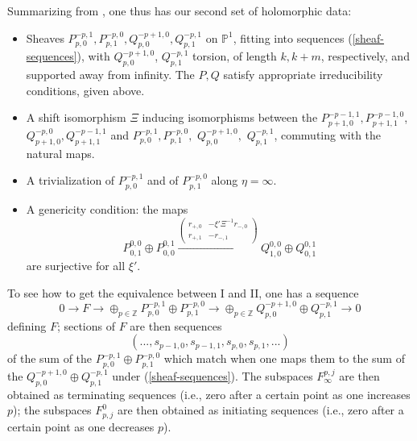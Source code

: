 \documentclass[12pt]{article}
\theoremstyle{definition}
\theoremstyle{remark}
\numberwithin{theorem}{section}
\def\bZ{{\mathbb {Z}}}
\def\bP{{\mathbb {P}}}
\begin{document}
Summarizing  from \cite{Charbonneau:2006gu}, one thus has our second set of holomorphic data:
\begin{itemize} \item Sheaves $P_{p,0}^{-p,1},P_{p,1}^{-p,0} ,Q_{p,0}^{-p+1,0}, Q_{p,1}^{-p,1}$ on $\bP^1$, fitting into sequences (\ref{sheaf-sequences}), with   $Q_{p,0}^{-p+1,0}$, $Q_{p,1}^{-p ,1}$ torsion, of length $k, k+m$, respectively, and supported away from infinity. The  $P,Q$ satisfy appropriate irreducibility conditions, given above.
\item A shift isomorphism $\Xi$ inducing isomorphisms between the  $P_{p+1,0}^{-p-1,1},P_{p+1,1}^{-p-1,0}$, $Q_{p+1,0}^{-p ,0}, Q_{p+1,1}^{-p-1,1}$ and $P_{p,0}^{-p,1}, P_{p,1}^{-p,0},$ $Q_{p,0}^{-p+1,0},$ $Q_{p,1}^{-p,1}$, commuting with the natural maps.
\item A trivialization of $P_{p,0}^{-p,1}$ and of $P_{p,1}^{-p,0}$ along $\eta = \infty$.
\item A genericity condition: the maps
\begin{equation}
 P^{0,0}_{0,1}\oplus P^{0,1}_{0,0} \xrightarrow{\begin{pmatrix}  r_{+,0}& -\xi'\Xi^{-1}r_{-,0}\\r_{+,1}&-r_{-,1}\end{pmatrix}} Q_{1,0}^{0,0}\oplus Q_{0,1}^{0,1}
 \end{equation} 
 are surjective for all $\xi'$.
\end{itemize}

To see how to get the equivalence between I and II, one has a sequence 
$$ 0\rightarrow F\rightarrow \mathop{\oplus}_{p\in \bZ} P_{p,0}^{-p,1}\oplus P_{p,1}^{-p,0}\rightarrow  \mathop{\oplus}_{p\in \bZ} Q_{p,0}^{-p+1,0}\oplus Q_{p,1}^{-p ,1}\rightarrow 0$$ defining $F$; sections of $F$ are then sequences 
$$ (..., s_{p-1,0},s_{p-1,1},s_{p,0},s_{p ,1},...)\label {sequence-p}$$
of the sum of the $P_{p,0}^{-p,1}\oplus P_{p,1}^{-p,0}$ which match when one maps them to the sum of the $ Q_{p,0}^{-p+1,0}\oplus Q_{p,1}^{-p ,1}$ under (\ref{sheaf-sequences}). The subspaces $F_\infty^{p,j}$ are then obtained as terminating sequences (i.e., zero after a certain point as one increases $p$); the subspaces $F^0_{p,j}$ are then obtained as initiating sequences (i.e., zero after a certain point as one decreases $p$). 
\end{document}
